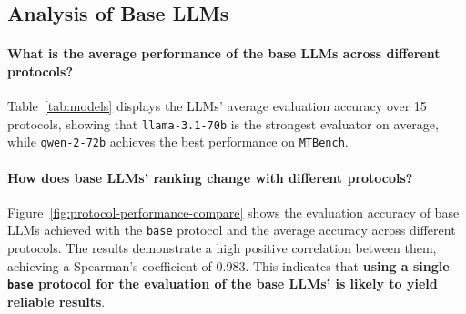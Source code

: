 \documentclass[11pt]{article}
\newcommand{\mtbench}{\texttt{MTBench}\xspace}
\begin{document}
\subsection{Analysis of Base LLMs}
\label{subsec:llm-analysis}




\paragraph{What is the average performance of the base LLMs across different protocols?}
Table~\ref{tab:models} displays the LLMs' average evaluation accuracy over 15 protocols, showing that \texttt{llama-3.1-70b} is the strongest evaluator on average, while \texttt{qwen-2-72b} achieves the best performance on \mtbench.

\paragraph{How does base LLMs' ranking change with different protocols?}
Figure~\ref{fig:protocol-performance-compare} shows the evaluation accuracy of base LLMs achieved with the \texttt{base} protocol and the average accuracy across different protocols.
The results demonstrate a high positive correlation between them, achieving a Spearman's coefficient of 0.983.
This indicates that \textbf{using a single \texttt{base} protocol for the evaluation of the base LLMs' is likely to yield reliable results}.
\end{document}
